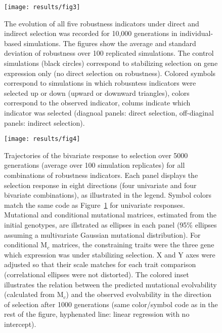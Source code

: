 \documentclass[10pt,a4paper]{article}
\begin{document}
\begin{figure}[tp!]
\begin{adjustwidth}{-1in}{0in}
\begin{flushright}
\texttt{[image: results/fig3]}
\caption{\color{Gray} \label{fig:evol} The evolution of all five robustness indicators under direct and indirect selection was recorded for 10,000 generations in individual-based simulations. The figures show the average and standard deviation of robustness over 100 replicated simulations. The control simulations (black circles) correspond to stabilizing selection on gene expression only (no direct selection on robustness). Colored symbols correspond to simulations in which robusntess indicators were selected up or down (upward or downward triangles), colors correspond to the observed indicator, colums indicate which indicator was selected (diagnoal panels: direct selection, off-diaginal panels: indirect selection).}
\end{flushright}\end{adjustwidth}
\end{figure}

\begin{figure}[thp!]
\begin{adjustwidth}{-1in}{0in}
\begin{flushright}
\texttt{[image: results/fig4]}
\caption{\color{Gray} \label{fig:evolvability} Trajectories of the bivariate response to selection over 5000 generations (average over 100 simulation replicates) for all combinations of robustness indicators. Each panel displays the selection response in eight directions (four univariate and four bivariate combinations), as illustrated in the legend. Symbol colors match the same code as Figure~\ref{fig:evol} for univariate responses. Mutational and conditional mutational matrices, estimated from the initial genotypes, are illstrated as ellipses in each panel (95\% ellipses assuming a multivariate Gaussian mutational distribution). For conditional $\bm{\mathrm M}_c$ matrices, the constraining traits were the three gene which expression was under stabilizing selection. X and Y axes were adjusted so that their scale matches for each trait comparison (correlational ellipses were not distorted). The colored inset illustrates the relation between the predicted mutational evolvability (calculated from $\bm{\mathrm M}_c$) and the observed evolvability in the direction of selection after 1000 generations (same color/symbol code as in the rest of the figure, hyphenated line: linear regression with no intercept). }
\end{flushright}\end{adjustwidth}
\end{figure}
\end{document}
